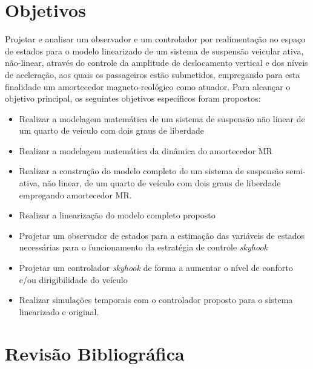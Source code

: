 \documentclass[a4paper]{ifacconf}
\begin{document}
    \section{Objetivos}
    Projetar e analisar um observador e um controlador por realimentação no espaço de estados para o modelo linearizado de um sistema de suspensão veicular ativa, não-linear, através do controle da amplitude de deslocamento vertical e dos níveis de aceleração, aos quais os passageiros estão submetidos, empregando para esta finalidade um amortecedor magneto-reológico como atuador. 
    Para alcançar o objetivo principal, os seguintes objetivos específicos foram propostos:
    \begin{itemize}
        \item Realizar a modelagem matemática de um sistema de suspensão não linear de um quarto de veículo com dois graus de liberdade
        \item Realizar a modelagem matemática da dinâmica do amortecedor MR
        \item Realizar a construção do modelo completo de um sistema de suspensão semi-ativa, não linear, de um quarto de veículo com dois graus de liberdade empregando amortecedor MR.
        \item Realizar a linearização do modelo completo proposto
        \item Projetar um observador de estados para a estimação das variáveis de estados necessárias para o funcionamento da estratégia de controle \emph{skyhook}
        \item Projetar um controlador \emph{skyhook} de forma a aumentar o nível de conforto e/ou dirigibilidade do veículo
        \item Realizar simulações temporais com o controlador proposto para o sistema linearizado e original.
    \end{itemize}
    \section{Revisão Bibliográfica}
\end{document}
